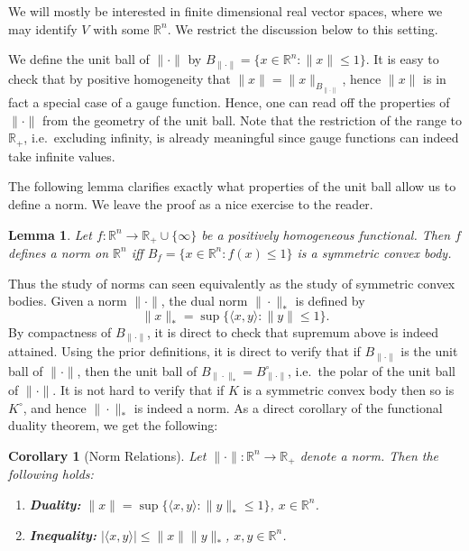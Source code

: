 \documentclass[11pt]{article}
\newtheorem{corollary}[theorem]{Corollary}
\newtheorem{lemma}[theorem]{Lemma}
\theoremstyle{plain}
\theoremstyle{plain}
\newcommand{\set}[1]{\{{#1}\}}
\newcommand{\R}{\ensuremath{\mathbb{R}}}
\newcommand{\pr}[2]{\langle{#1, #2}\rangle}
\begin{document}
We will mostly be interested in finite dimensional real vector spaces, where we
may identify $V$ with some $\R^n$. We restrict the discussion below to this
setting. 

We define the unit ball of $\|\cdot\|$ by $B_{\|\cdot\|} = \set{x \in \R^n:
\|x\| \leq 1}$. It is easy to check that by positive homogeneity that $\|x\| =
\|x\|_{B_{\|\cdot\|}}$, hence $\|x\|$ is in fact a special case of a gauge
function. Hence, one can read off the properties of $\|\cdot\|$ from the
geometry of the unit ball. Note that the restriction of the range to $\R_+$,
i.e.~excluding infinity, is already meaningful since gauge functions can indeed
take infinite values.

The following lemma clarifies exactly what properties of the unit ball allow us
to define a norm. We leave the proof as a nice exercise to the reader.

\begin{lemma} 
Let $f: \R^n \rightarrow \R_+ \cup \set{\infty}$ be a positively homogeneous
functional. Then $f$ defines a norm on $\R^n$ iff $B_f = \set{x \in \R^n: f(x)
\leq 1}$ is a symmetric convex body. 
\end{lemma}

Thus the study of norms can seen equivalently as the study of symmetric convex
bodies. Given a norm $\|\cdot\|$, the dual norm $\|\cdot\|_*$ is defined by
\begin{equation}
\label{def:dual-norm}
\|x\|_* = \sup \set{\pr{x}{y}: \|y\| \leq 1}.
\end{equation}
By compactness of $B_{\|\cdot\|}$, it is direct to check that supremum above is
indeed attained. Using the prior definitions, it is direct to verify that if
$B_{\|\cdot\|}$ is the unit ball of $\|\cdot\|$, then the unit ball of
$B_{\|\cdot\|_*} = B_{\|\cdot\|}^\circ$, i.e.~the polar of the unit ball of
$\|\cdot\|$. It is not hard to verify that if $K$ is a symmetric convex body
then so is $K^\circ$, and hence $\|\cdot\|_*$ is indeed a norm. As a direct
corollary of the functional duality theorem, we get the following:

\begin{corollary}[Norm Relations] Let $\|\cdot\| : \R^n \rightarrow \R_+$ denote a
norm. Then the following holds:
\begin{enumerate}
\item {\bf Duality:} $\|x\| = \sup \set{\pr{x}{y}: \|y\|_* \leq 1}$, $x \in \R^n$.
\item {\bf Inequality:} $|\pr{x}{y}| \leq \|x\| \|y\|_*$, $x,y \in \R^n$.  
\end{enumerate}
\end{corollary}
\end{document}

